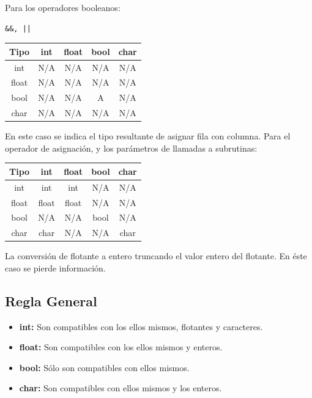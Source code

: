 \documentclass[11pt, spanish]{report}
\begin{document}
\newpage

Para los operadores booleanos:

\begin{verbatim} 
&&, ||
\end{verbatim}

\begin{table}[!hbp]
  \begin{tabular}{c c c c c}
    \hline            
    Tipo  & int & float & bool & char \\ [0.5ex]
    \hline                         
    int   & N/A & N/A   & N/A  & N/A \\        
    float & N/A & N/A   & N/A  & N/A \\
    bool  & N/A & N/A   & A    & N/A \\
    char  & N/A & N/A   & N/A  & N/A \\ [1ex]
    \hline                         
  \end{tabular}    
\end{table}

En este caso se indica el tipo resultante de asignar fila con columna. Para el operador de asignaci\'on, y los par\'ametros de llamadas a subrutinas: 

\begin{table}[!hbp]
  \begin{tabular}{c c c c c}
    \hline            
    Tipo  & int   & float & bool & char \\ [0.5ex]
    \hline                         
    int   & int   & int & N/A    & N/A \\        
    float & float & float & N/A  & N/A \\
    bool  & N/A   & N/A   & bool & N/A \\
    char  & char  & N/A   & N/A  & char \\ [1ex]
    \hline
  \end{tabular}    
\end{table}

La conversión de flotante a entero truncando el valor entero del flotante. En \'este caso se pierde informaci\'on.

\subsection{Regla General}

  \begin{itemize}
  \item \textbf{int:} Son compatibles con los ellos mismos, flotantes y caracteres.
  \item \textbf{float:} Son compatibles con los ellos mismos y enteros.
  \item \textbf{bool:} S\'olo son compatibles con ellos mismos.
  \item \textbf{char:} Son compatibles con ellos mismos y los enteros.
  \end{itemize}
\end{document}
